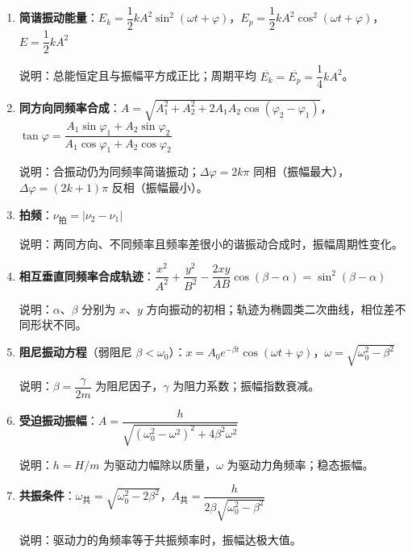 \documentclass[12pt,a4paper]{ctexart}
\begin{document}
\begin{enumerate}[leftmargin=3em,label=\textbf{公式\arabic*}：,ref=公式\arabic*]
    \item \textbf{简谐振动能量}：$E_k=\dfrac{1}{2}kA^2\sin^2(\omega t+\varphi)$，$E_p=\dfrac{1}{2}kA^2\cos^2(\omega t+\varphi)$，$E=\dfrac{1}{2}kA^2$

    说明：总能恒定且与振幅平方成正比；周期平均 $\overline{E_k}=\overline{E_p}=\dfrac{1}{4}kA^2$。

    \item \textbf{同方向同频率合成}：$A=\sqrt{A_1^2+A_2^2+2A_1A_2\cos(\varphi_2-\varphi_1)}$，$\tan\varphi=\dfrac{A_1\sin\varphi_1+A_2\sin\varphi_2}{A_1\cos\varphi_1+A_2\cos\varphi_2}$

    说明：合振动仍为同频率简谐振动；$\Delta\varphi=2k\pi$ 同相（振幅最大），$\Delta\varphi=(2k+1)\pi$ 反相（振幅最小）。

    \item \textbf{拍频}：$\nu_{\text{拍}}=|\nu_2-\nu_1|$

    说明：两同方向、不同频率且频率差很小的谐振动合成时，振幅周期性变化。

    \item \textbf{相互垂直同频率合成轨迹}：$\dfrac{x^2}{A^2}+\dfrac{y^2}{B^2}-\dfrac{2xy}{AB}\cos(\beta-\alpha)=\sin^2(\beta-\alpha)$

    说明：$\alpha$、$\beta$ 分别为 $x$、$y$ 方向振动的初相；轨迹为椭圆类二次曲线，相位差不同形状不同。

    \item \textbf{阻尼振动方程}（弱阻尼 $\beta<\omega_0$）：$x=A_0 e^{-\beta t}\cos(\omega t+\varphi)$，$\omega=\sqrt{\omega_0^2-\beta^2}$

    说明：$\beta=\dfrac{\gamma}{2m}$ 为阻尼因子，$\gamma$ 为阻力系数；振幅指数衰减。

    \item \textbf{受迫振动振幅}：$A=\dfrac{h}{\sqrt{(\omega_0^2-\omega^2)^2+4\beta^2\omega^2}}$

    说明：$h=H/m$ 为驱动力幅除以质量，$\omega$ 为驱动力角频率；稳态振幅。

    \item \textbf{共振条件}：$\omega_{\text{共}}=\sqrt{\omega_0^2-2\beta^2}$，$A_{\text{共}}=\dfrac{h}{2\beta\sqrt{\omega_0^2-\beta^2}}$

    说明：驱动力的角频率等于共振频率时，振幅达极大值。

\end{enumerate}
\end{document}
